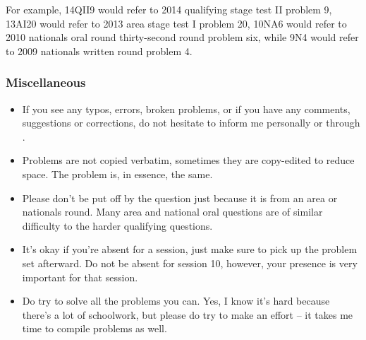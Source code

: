 \documentclass[10pt,paper=letter]{scrartcl}
\begin{document}
For example, 14QII9 would refer to 2014 qualifying stage test II problem 9, 13AI20 would refer to 2013 area stage test I problem 20, 10NA6 would refer to 2010 nationals oral round thirty-second round problem six, while 9N4 would refer to 2009 nationals written round problem 4.

\subsubsection*{Miscellaneous}

\begin{itemize}

\item If you see any typos, errors, broken problems, or if you have any comments, suggestions or corrections, do not hesitate to inform me personally or through .

\item Problems are not copied verbatim, sometimes they are copy-edited to reduce space. The problem is, in essence, the same.

\item Please don't be put off by the question just because it is from an area or nationals round. Many area and national oral questions are of similar difficulty to the harder qualifying questions.

\item It's okay if you're absent for a session, just make sure to pick up the problem set afterward. Do not be absent for session 10, however, your presence is very important for that session.

\item Do try to solve all the problems you can. Yes, I know it's hard because there's a lot of schoolwork, but please do try to make an effort -- it takes me time to compile problems as well.

\end{itemize}
\end{document}
